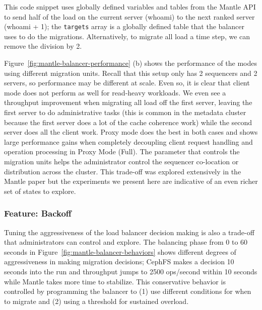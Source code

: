 This code snippet uses globally defined variables and tables from the Mantle
API to send half of the load on the current server (whoami) to the next ranked
server (whoami + 1); the \texttt{targets} array is a globally defined table
that the balancer uses to do the migrations. Alternatively, to migrate all load
a time step, we can remove the division by 2.


Figure~\ref{fig:mantle-balancer-performance} (b) shows the performance of the
modes using different migration units. Recall that this setup only has 2
sequencers and 2 servers, so performance may be different at scale. Even so, it
is clear that client mode does not perform as well for read-heavy workloads. We
even see a throughput improvement when migrating all load off the first server,
leaving the first server to do administrative tasks (this is common in the
metadata cluster because the first server does a lot of the cache coherence
work) while the second server does all the client work. Proxy mode does the
best in both cases and shows large performance gains when completely decoupling
client request handling and operation processing in Proxy Mode (Full).  The
parameter that controls the migration units helps the administrator control the
sequencer co-location or distribution across the cluster. This trade-off was
explored extensively in the Mantle paper but the experiments we present here
are indicative of an even richer set of states to explore.

\subsubsection{Feature: Backoff}
\label{sec:feature-backoff}

Tuning the aggressiveness of the load balancer decision making is also a
trade-off that administrators can control and explore. The balancing phase from
0 to 60 seconds in Figure~\ref{fig:mantle-balancer-behaviors} shows different
degrees of aggressiveness in making migration decisions; CephFS makes a
decision 10 seconds into the run and throughput jumps to 2500 ops/second within 10 seconds
while Mantle takes more time to stabilize. This conservative behavior is
controlled by programming the balancer to (1) use different conditions for when
to migrate and (2) using a threshold for sustained overload. 

